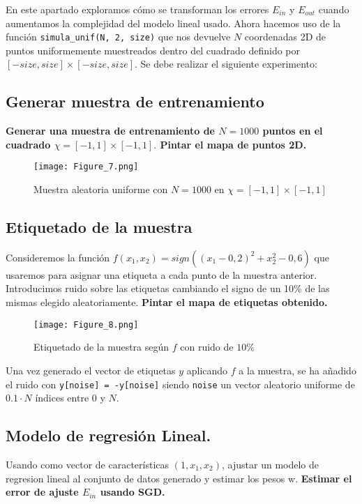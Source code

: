 En este apartado exploramos cómo se transforman los errores $E_{in}$ y $E_{out}$
cuando aumentamos la complejidad del modelo lineal usado. Ahora hacemos uso de
la función \texttt{simula_unif(N, 2, size)} que nos devuelve $N$
coordenadas 2D de puntos uniformemente muestreados dentro del cuadrado definido
por  $[−size,size] \times [−size, size]$. Se debe realizar el siguiente experimento:

\subsection{Generar muestra de entrenamiento}

\textbf{Generar una muestra de entrenamiento de $N = 1000$ puntos en el cuadrado
$\chi = [−1, 1] \times [−1, 1].$ Pintar el mapa de puntos 2D.}

\begin{figure}[H]
\centering
\texttt{[image: Figure\_7.png]}
\caption{Muestra aleatoria uniforme con $N = 1000$ en $\chi=[-1, 1] \times [-1, 1]$}
\end{figure}


\subsection{Etiquetado de la muestra}

Consideremos la función $f(x_1, x_2) = sign\left( (x_1 − 0,2)^2 + x_2^2 − 0,6 \right)$ 
que usaremos para asignar una etiqueta a cada punto de la muestra anterior.
Introducimos ruido sobre las etiquetas cambiando el signo de un 10\%
de las mismas elegido aleatoriamente. \textbf{Pintar el mapa de etiquetas obtenido.}

\begin{figure}[H]
\centering
\texttt{[image: Figure\_8.png]}
\caption{Etiquetado de la muestra según $f$ con ruido de $10\%$}
\end{figure}

Una vez generado el vector de etiquetas $y$ aplicando $f$ a la muestra, se ha añadido 
el ruido con \texttt{y[noise] = -y[noise]} siendo \texttt{noise}
un vector aleatorio uniforme de $0.1 \cdot N$ índices entre $0$ y $N$. 


\subsection{Modelo de regresión Lineal.}

Usando como vector de características $(1, x_1, x_2)$, ajustar un modelo de
regresion lineal al conjunto de datos generado y estimar los pesos w. 
\textbf{Estimar el error de ajuste $E_{in}$ usando SGD.}

